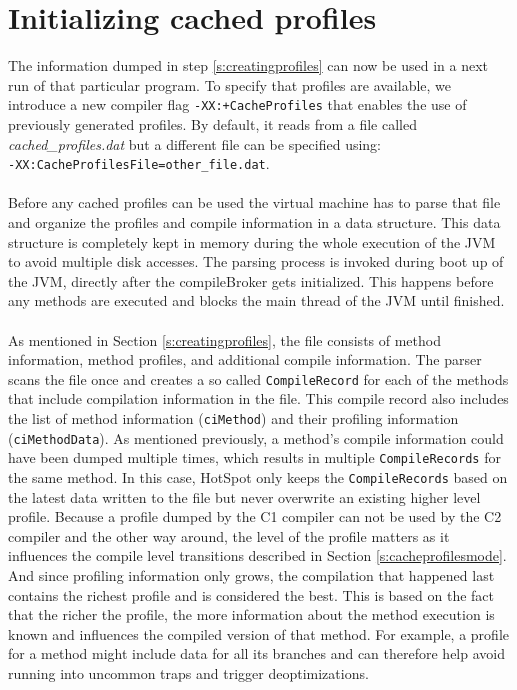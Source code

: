 \section{Initializing cached profiles}
\label{s:initializingprofiles}
The information dumped in step \ref{s:creatingprofiles} can now be used in a next run of that particular program.
To specify that profiles are available, we introduce a new compiler flag \texttt{-XX:+CacheProfiles} that enables the use of previously generated profiles. By default, it reads from a file called \textit{cached\_profiles.dat} but a different file can be specified using:\\ \texttt{-XX:CacheProfilesFile=other\_file.dat}.
\\\\
Before any cached profiles can be used the virtual machine has to parse that file and organize the profiles and compile information in a data structure. This data structure is completely kept in memory during the whole execution of the JVM to avoid multiple disk accesses.
The parsing process is invoked during boot up of the JVM, directly after the compileBroker gets initialized. This happens before any methods are executed and blocks the main thread of the JVM until finished.
\\\\
As mentioned in Section \ref{s:creatingprofiles}, the file consists of method information, method profiles, and additional compile information. The parser scans the file once and creates a so called \texttt{CompileRecord} for each of the methods that include compilation information in the file. This compile record also includes the list of method information (\texttt{ciMethod}) and their profiling information (\texttt{ciMethodData}).
As mentioned previously, a method's compile information could have been dumped multiple times, which results in multiple \texttt{CompileRecords} for the same method. In this case, HotSpot only keeps the \texttt{CompileRecords} based on the latest data written to the file but never overwrite an existing higher level profile.
Because a profile dumped by the C1 compiler can not be used by the C2 compiler and the other way around, the level of the profile matters as it influences the compile level transitions described in Section \ref{s:cacheprofilesmode}.
And since profiling information only grows, the compilation that happened last contains the richest profile and is considered the best.
This is based on the fact that the richer the profile, the more information about the method execution is known and influences the compiled version of that method. For example, a profile for a method might include data for all its branches and can therefore help avoid running into uncommon traps and trigger deoptimizations.
